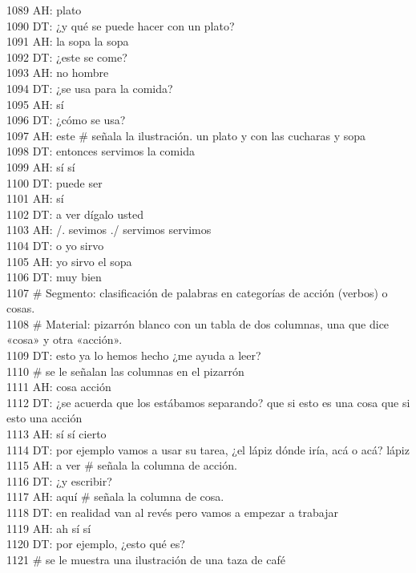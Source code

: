 1089 AH: plato\\
1090 DT: ¿y qué se puede hacer con un plato?\\
1091 AH: la sopa la sopa\\
1092 DT: ¿este se come?\\
1093 AH: no hombre\\
1094 DT: ¿se usa para la comida?\\
1095 AH: sí\\
1096 DT: ¿cómo se usa?\\
1097 AH: este # señala la ilustración. un plato y con las cucharas y sopa\\
1098 DT: entonces servimos la comida\\
1099 AH: sí sí\\
1100 DT: puede ser\\
1101 AH: sí\\
1102 DT: a ver dígalo usted\\
1103 AH: /. sevimos ./ servimos servimos\\
1104 DT: o yo sirvo\\
1105 AH: yo sirvo el sopa\\
1106 DT: muy bien\\
1107 # Segmento: clasificación de palabras en categorías de acción (verbos) o cosas.\\
1108 # Material: pizarrón blanco con un tabla de dos columnas, una  que dice «cosa» y otra «acción».\\
1109 DT: esto ya lo hemos hecho ¿me ayuda a leer?\\
1110 # se le señalan las columnas en el pizarrón\\
1111 AH: cosa acción\\
1112 DT: ¿se acuerda que los estábamos separando? que si esto es una cosa que si esto una acción\\
1113 AH: sí sí cierto\\
1114 DT: por ejemplo vamos a usar su tarea, ¿el lápiz dónde iría, acá o acá? lápiz\\
1115 AH: a ver # señala la columna de acción.\\
1116 DT: ¿y escribir?\\
1117 AH: aquí # señala la columna de cosa.\\
1118 DT: en realidad van al revés pero vamos a empezar a trabajar\\
1119 AH: ah sí sí\\
1120 DT: por ejemplo, ¿esto qué es?\\
1121 # se le muestra una ilustración de una taza de café\\
